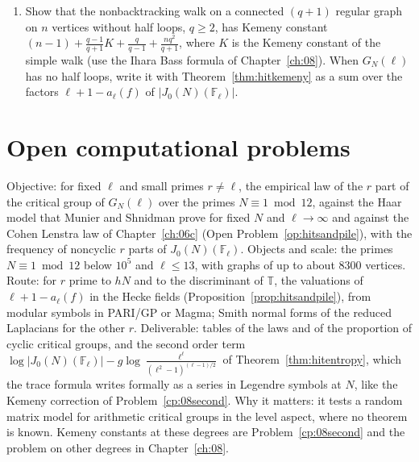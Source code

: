 \begin{enumerate}
\[
\sum_{x,y}c_xc_y\E_x\tau_y=(\deg e_D)\sum_yc_y\E_\pi\tau_y-(\ell+1)\sum_f\frac{\bigl|\sum_yc_y\phi_f(y)\bigr|^2}{\ell+1-a_\ell(f)},
\]
using $\E_x\tau_y=(Z(y,y)-Z(x,y))/\pi(y)$ (Theorem~\ref{thm:A:kemeny}), and deduce from Gross's formula that the last sum is a combination of the $L(f,1)L(f\otimes\chi_D,1)/(\ell+1-a_\ell(f))$ with positive coefficients that do not depend on $\ell$.
\item\label{ex:hitnonback} Show that the nonbacktracking walk on a connected $(q+1)$ regular graph on $n$ vertices without half loops, $q\ge2$, has Kemeny constant $(n-1)+\frac{q-1}{q+1}K+\frac q{q-1}+\frac{nq^2}{q+1}$, where $K$ is the Kemeny constant of the simple walk (use the Ihara Bass formula of Chapter~\ref{ch:08}). When $G_N(\ell)$ has no half loops, write it with Theorem~\ref{thm:hitkemeny} as a sum over the factors $\ell+1-a_\ell(f)$ of $|J_0(N)(\mathbb F_\ell)|$.
\end{enumerate}

\section{Open computational problems}

\begin{compproblem}\label{cp:hittables}
Objective: for fixed $\ell$ and small primes $r\ne\ell$, the empirical law of the $r$ part of the critical group of $G_N(\ell)$ over the primes $N\equiv1\bmod12$, against the Haar model that Munier and Shnidman prove for fixed $N$ and $\ell\to\infty$ and against the Cohen Lenstra law of Chapter~\ref{ch:06c} (Open Problem~\ref{op:hitsandpile}), with the frequency of noncyclic $r$ parts of $J_0(N)(\mathbb F_\ell)$. Objects and scale: the primes $N\equiv1\bmod12$ below $10^5$ and $\ell\le13$, with graphs of up to about $8300$ vertices. Route: for $r$ prime to $hN$ and to the discriminant of $\mathbb T$, the valuations of $\ell+1-a_\ell(f)$ in the Hecke fields (Proposition~\ref{prop:hitsandpile}), from modular symbols in PARI/GP or Magma; Smith normal forms of the reduced Laplacians for the other $r$. Deliverable: tables of the laws and of the proportion of cyclic critical groups, and the second order term $\log|J_0(N)(\mathbb F_\ell)|-g\log\frac{\ell^\ell}{(\ell^2-1)^{(\ell-1)/2}}$ of Theorem~\ref{thm:hitentropy}, which the trace formula writes formally as a series in Legendre symbols at $N$, like the Kemeny correction of Problem~\ref{cp:08second}. Why it matters: it tests a random matrix model for arithmetic critical groups in the level aspect, where no theorem is known. Kemeny constants at these degrees are Problem~\ref{cp:08second} and the problem on other degrees in Chapter~\ref{ch:08}.
\end{compproblem}

